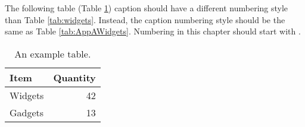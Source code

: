 The following table (Table \ref{tab:AppBWidgets}) caption should have a different numbering style than Table \ref{tab:widgets}. Instead, the caption numbering style should be the same as Table \ref{tab:AppAWidgets}. Numbering in this chapter should start with \thesection.

\begin{table}[!h]
\centering
\caption{An example table.}\label{tab:AppBWidgets}
\begin{tabular}{lr}
Item & Quantity \\
\hline
Widgets & 42 \\
Gadgets & 13
\end{tabular}
\end{table}
